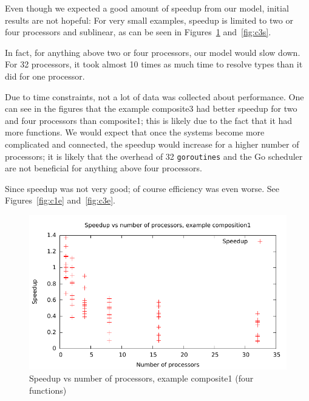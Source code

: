 \documentclass{acm_proc_article-sp}
\begin{document}
Even though we expected a good amount of speedup from our model, initial
results are not hopeful: For very small examples, speedup is limited to two or
four processors and sublinear, as can be seen in Figures~\ref{fig:c1s}
and~\ref{fig:c3s}. 

In fact, for anything above two or four processors, our model would slow down.
For 32 processors, it took almost 10 times as much time to resolve types than
it did for one processor.

Due to time constraints, not a lot of data was collected about performance. One
can see in the figures that the example composite3 had better speedup for two
and four processors than composite1; this is likely due to the fact that it had
more functions. We would expect that once the systems become more complicated
and connected, the speedup would increase for a higher number of processors; it
is likely that the overhead of 32 \texttt{goroutines} and the Go scheduler are
not beneficial for anything above four processors.

Since speedup was not very good; of course efficiency was even worse. See
Figures~\ref{fig:c1e} and~\ref{fig:c3e}.

\begin{figure}[ht] 
	\centering
	\includegraphics[scale=0.6]{../../data/composite1-speedup.pdf}
	\caption{Speedup vs number of processors, example composite1 (four
	functions)} 
	\label{fig:c1s} 
\end{figure} 
\end{document}
